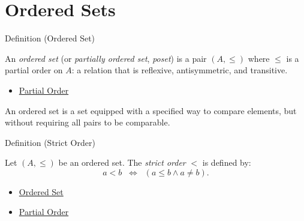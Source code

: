 
\section{Ordered Sets}\label{sec:ordered-sets}


\begin{definitionbox}{Definition (Ordered Set)}
\begin{definition}\label{def:ordered-set}
An \emph{ordered set} (or \emph{partially ordered set}, \emph{poset}) is a
pair $(A,\leq)$ where $\leq$ is a partial order on $A$: a relation that is
reflexive, antisymmetric, and transitive.
\end{definition}
\end{definitionbox}

\begin{dependencies}
\begin{itemize}
  \item \hyperref[def:partial-order]{Partial Order}
\end{itemize}
\end{dependencies}

\begin{remark*}
An ordered set is a set equipped with a specified way to compare elements,
but without requiring all pairs to be comparable.
\end{remark*}

\begin{definitionbox}{Definition (Strict Order)}
\begin{definition}\label{def:strict-order}
Let $(A,\leq)$ be an ordered set. The \emph{strict order} $<$ is defined by:
\[
a < b \;\;\Longleftrightarrow\;\; (a \leq b \land a \neq b).
\]
\end{definition}
\end{definitionbox}

\begin{dependencies}
\begin{itemize}
  \item \hyperref[def:ordered-set]{Ordered Set}
  \item \hyperref[def:partial-order]{Partial Order}
\end{itemize}
\end{dependencies}

